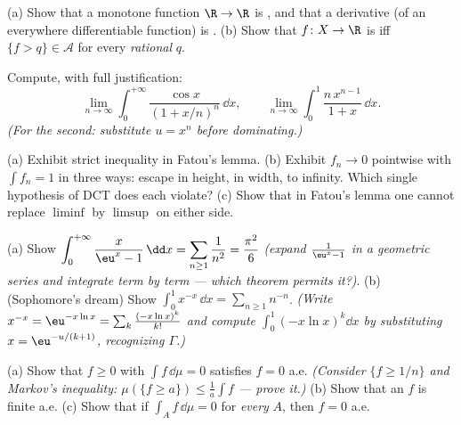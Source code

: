 \begin{exercise}[$\star$]\label{exo:b3:lebesgue:1}
(a) Show that a monotone function $\R \to \R$ is
, and that a derivative (of an everywhere
differentiable function) is .
(b) Show that $f \colon X \to \R$ is  iff $\{f > q\}
\in \mathcal A$ for every \emph{rational} $q$.
\end{exercise}

\begin{exercise}[$\star$]\label{exo:b3:lebesgue:2}
Compute, with full justification:
\[
\lim_{n\to\infty}\int_0^{+\infty}
\frac{\cos x}{(1 + x/n)^{n}}\,\dd x,
\qquad
\lim_{n\to\infty}\int_0^1 \frac{n\,x^{n-1}}{1 + x}\,\dd x .
\]
\emph{(For the second: substitute $u = x^n$ before dominating.)}
\end{exercise}

\begin{exercise}[$\star\star$]\label{exo:b3:lebesgue:3}
(a) Exhibit strict inequality in Fatou's lemma.
(b) Exhibit $f_n \to 0$ pointwise with $\int f_n = 1$ in three
ways: escape in height, in width, to infinity. Which single
hypothesis of DCT does each violate?
(c) Show that in Fatou's lemma one cannot replace $\liminf$ by
$\limsup$ on either side.
\end{exercise}

\begin{exercise}[$\star\star$]\label{exo:b3:lebesgue:4}
(a) Show $\displaystyle\int_0^{+\infty}\frac{x}{\eu^x -
1}\,\dd x = \sum_{n\geq1}\frac1{n^2} = \frac{\pi^2}6$
\emph{(expand $\frac1{\eu^x - 1}$ in a geometric series and
integrate term by term --- which theorem permits it?)}.
(b) (Sophomore's dream) Show
$\displaystyle\int_0^1 x^{-x}\,\dd x = \sum_{n\geq1}n^{-n}$.
\emph{(Write $x^{-x} = \eu^{-x\ln x} = \sum_k\frac{(-x\ln
x)^k}{k!}$ and compute $\int_0^1(-x\ln x)^k\dd x$ by
substituting $x = \eu^{-u/(k+1)}$, recognizing $\Gamma$.)}
\end{exercise}

\begin{exercise}[$\star\star$]\label{exo:b3:lebesgue:5}
(a) Show that $f \geq 0$  with $\int f\,\dd\mu = 0$
satisfies $f = 0$ a.e. \emph{(Consider $\{f \geq 1/n\}$ and
Markov's inequality: $\mu(\{f \geq a\}) \leq \frac1a\int f$ ---
prove it.)}
(b) Show that an  $f$ is finite a.e.
(c) Show that if $\int_A f\,\dd\mu = 0$ for \emph{every}
 $A$, then $f = 0$ a.e.
\end{exercise}

